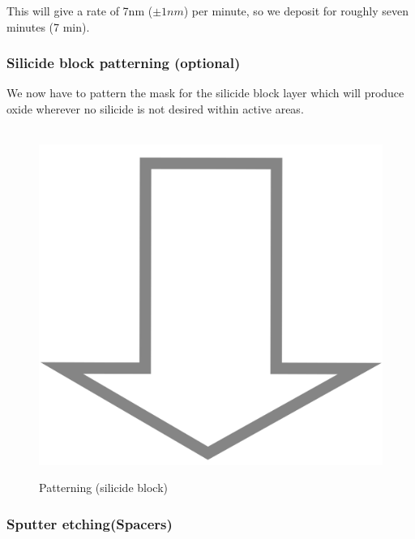 This will give a rate of 7nm ($\pm 1nm$) per minute, so we deposit for roughly seven minutes (7 min).

\subsubsection{Silicide block patterning (optional)}

We now have to pattern the mask for the silicide block layer which will produce oxide wherever no silicide is not desired within active areas.

\begin{figure}[H]
	\centering
	\begin{tikzpicture}[node distance = 3cm, auto, thick,scale=\CrossSectionOnly, every node/.style={transform shape}]
		
	\end{tikzpicture}\\
	\includegraphics[scale=0.01]{down_arrow.png}\\
	\begin{tikzpicture}[node distance = 3cm, auto, thick,scale=\CrossSectionOnly, every node/.style={transform shape}]
		
	\end{tikzpicture}
	\caption{Patterning (silicide block)}
\end{figure}

\subsubsection{Sputter etching(Spacers)}

